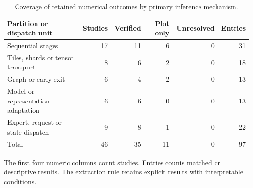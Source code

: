 \begin{table}[tbp]
\caption{Coverage of retained numerical outcomes by primary inference mechanism.}\label{tab:coverage}
\centering\small\setlength{\tabcolsep}{4pt}
\begin{tabular}{@{}p{.31\linewidth}rrrrr@{}}
\toprule
Partition or dispatch unit & Studies & Verified & Plot only & Unresolved & Entries \\
\midrule
Sequential stages & 17 & 11 & 6 & 0 & 31 \\
Tiles, shards or tensor transport & 8 & 6 & 2 & 0 & 18 \\
Graph or early exit & 6 & 4 & 2 & 0 & 13 \\
Model or representation adaptation & 6 & 6 & 0 & 0 & 13 \\
Expert, request or state dispatch & 9 & 8 & 1 & 0 & 22 \\
Total & 46 & 35 & 11 & 0 & 97 \\
\bottomrule
\end{tabular}
\par\smallskip\raggedright The first four numeric columns count studies. Entries counts matched or descriptive results. The extraction rule retains explicit results with interpretable conditions.
\end{table}
